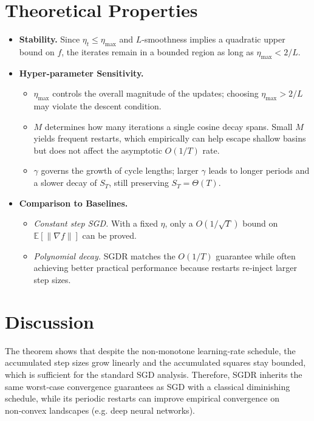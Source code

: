 \documentclass{article}
\begin{document}
\section*{Theoretical Properties}
\begin{itemize}
\item \textbf{Stability.}  Since $\eta_t\le\eta_{\max}$ and $L$‑smoothness
implies a quadratic upper bound on $f$, the iterates remain in a bounded
region as long as $\eta_{\max}<2/L$.
\item \textbf{Hyper‑parameter Sensitivity.}
    \begin{itemize}
        \item $\eta_{\max}$ controls the overall magnitude of the updates;
          choosing $\eta_{\max}>2/L$ may violate the descent condition.
        \item $M$ determines how many iterations a single cosine decay spans.
          Small $M$ yields frequent restarts, which empirically can help escape
          shallow basins but does not affect the asymptotic $O(1/T)$ rate.
        \item $\gamma$ governs the growth of cycle lengths; larger $\gamma$
          leads to longer periods and a slower decay of $S_T$, still preserving
          $S_T=\Theta(T)$.
    \end{itemize}
\item \textbf{Comparison to Baselines.}
    \begin{itemize}
        \item \emph{Constant step SGD.}  With a fixed $\eta$, only a
          $O(1/\sqrt{T})$ bound on $\mathbb{E}[\|\nabla f\|]$ can be proved.
        \item \emph{Polynomial decay.}  SGDR matches the $O(1/T)$ guarantee while
          often achieving better practical performance because restarts
          re‑inject larger step sizes.
    \end{itemize}
\end{itemize}

\section*{Discussion}
The theorem shows that despite the non‑monotone learning‑rate schedule,
the accumulated step sizes grow linearly and the accumulated squares stay
bounded, which is sufficient for the standard SGD analysis.  Therefore,
SGDR inherits the same worst‑case convergence guarantees as SGD with a
classical diminishing schedule, while its periodic restarts can improve
empirical convergence on non‑convex landscapes (e.g. deep neural networks).
\end{document}
